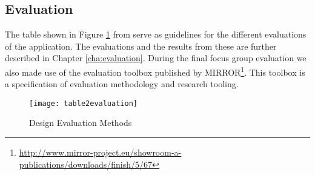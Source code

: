 \subsection{Evaluation} 
The table shown in Figure \ref{table2evaluation} from \citep{Esearch2004} serve as guidelines for the different evaluations of the application. The evaluations and the results from these are further described in Chapter \ref{cha:evaluation}. During the final focus group evaluation we also made use of the evaluation toolbox published by MIRROR\footnote{\url{http://www.mirror-project.eu/showroom-a-publications/downloads/finish/5/67}}. This toolbox is a specification of evaluation methodology and research tooling. 
\begin{figure}[H]
\centering
	\texttt{[image: table2evaluation]}
\caption{Design Evaluation Methods}
\label{table2evaluation}
\end{figure}
